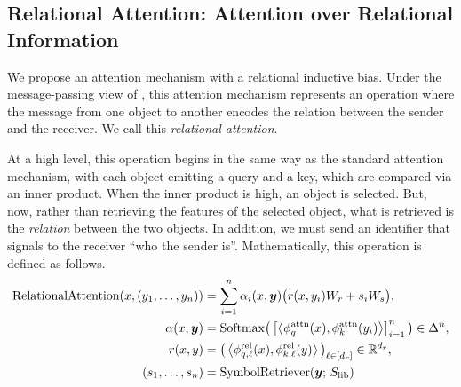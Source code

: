 \subsection{Relational Attention: Attention over Relational Information}

We propose an attention mechanism with a relational inductive bias. Under the message-passing view of , this attention mechanism represents an operation where the message from one object to another encodes the relation between the sender and the receiver. We call this \textit{relational attention}.

At a high level, this operation begins in the same way as the standard attention mechanism, with each object emitting a query and a key, which are compared via an inner product. When the inner product is high, an object is selected. But, now, rather than retrieving the features of the selected object, what is retrieved is the \textit{relation} between the two objects. In addition, we must send an identifier that signals to the receiver ``who the sender is''. Mathematically, this operation is defined as follows.
\begin{equation}\label{eq:rel_attn}
  \begin{split}
    \mathrm{RelationalAttention}(x, (y_1, \ldots, y_n)) &= \sum_{i=1}^{n} \alpha_i(x, \bm{y}) \big(r(x, y_i) W_r + s_i W_s\big), \\
    \alpha(x, \bm{y}) &= \mathrm{Softmax}\big(\left[\left \langle \phi_q^{\mathrm{attn}}(x), \phi_k^{\mathrm{attn}}(y_i) \right\rangle\right]_{i=1}^{n}\big) \in \Delta^n, \\
    r(x, y) &= \big(\left \langle \phi_{q, \ell}^{\mathrm{rel}}(x), \phi_{k, \ell}^{\mathrm{rel}}(y) \right\rangle\big)_{\ell \in [d_r]} \in \mathbb{R}^{d_r}, \\
    (s_1, \ldots, s_n) &= \mathrm{SymbolRetriever}(\bm{y};\,S_\mathrm{lib})
  \end{split}
\end{equation}



